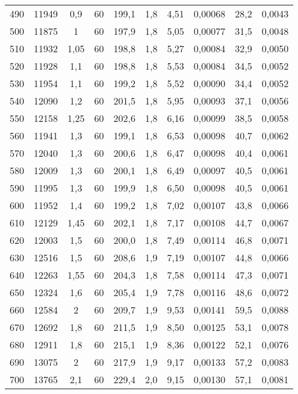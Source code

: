 \begin{table}[htpb]
\begin{tabular}{c c c c c c c c c c}
		490	&11949&	0,9	&60&199,1&1,8&4,51&0,00068&28,2&0,0043\\
		500	&11875&	1	&60&197,9&1,8&5,05&0,00077&31,5&0,0048\\
		510	&11932&	1,05&60&198,8&1,8&5,27&0,00084&32,9&0,0050\\
		520	&11928&	1,1	&60&198,8&1,8&5,53&0,00084&34,5&0,0052\\
		530	&11954&	1,1	&60&199,2&1,8&5,52&0,00090&34,4&0,0052\\
		540	&12090&	1,2	&60&201,5&1,8&5,95&0,00093&37,1&0,0056\\
		550	&12158&	1,25&60&202,6&1,8&6,16&0,00099&38,5&0,0058\\
		560	&11941&	1,3	&60&199,1&1,8&6,53&0,00098&40,7&0,0062\\
		570	&12040&	1,3	&60&200,6&1,8&6,47&0,00098&40,4&0,0061\\
		580	&12009&	1,3	&60&200,1&1,8&6,49&0,00097&40,5&0,0061\\
		590	&11995&	1,3	&60&199,9&1,8&6,50&0,00098&40,5&0,0061\\
		600	&11952&	1,4	&60&199,2&1,8&7,02&0,00107&43,8&0,0066\\
		610	&12129&	1,45&60&202,1&1,8&7,17&0,00108&44,7&0,0067\\
		620	&12003&	1,5	&60&200,0&1,8&7,49&0,00114&46,8&0,0071\\
		630	&12516&	1,5	&60&208,6&1,9&7,19&0,00107&44,8&0,0066\\
		640	&12263&	1,55&60&204,3&1,8&7,58&0,00114&47,3&0,0071\\
		650	&12324&	1,6	&60&205,4&1,9&7,78&0,00116&48,6&0,0072\\
		660	&12584&	2	&60&209,7&1,9&9,53&0,00141&59,5&0,0088\\
		670	&12692&	1,8	&60&211,5&1,9&8,50&0,00125&53,1&0,0078\\
		680	&12911&	1,8	&60&215,1&1,9&8,36&0,00122&52,1&0,0076\\
		690	&13075&	2	&60&217,9&1,9&9,17&0,00133&57,2&0,0083\\
		700	&13765&	2,1	&60&229,4&2,0&9,15&0,00130&57,1&0,0081\\
		 
	\end{tabular}
\end{table}

